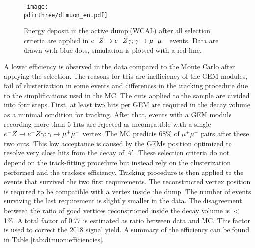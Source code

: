 \begin{figure}[tbh!]
  \centering
    \texttt{[image: \\pdirthree/dimuon\_en.pdf]}
  \caption[$\emu$ MC-DATA comparison in visible mode]{Energy deposit in the active dump (WCAL) after all selection criteria are applied in $\emu$ events. Data are drawn with blue dots, simulation is plotted with a red line.}
  \label{fig:dimuon_en}
\end{figure}

A lower efficiency is observed in the data compared to the Monte Carlo after applying the selection. The reasons for this are inefficiency of the GEM modules, fail of clusterization in some events and differences in the tracking procedure due to the simplifications used in the MC. The cuts applied to the sample are divided into four steps. First, at least two hits per GEM are required in the decay volume as a minimal condition for tracking. After that, events with a GEM module recording more than 5 hits are rejected as incompatible with a single $\emu$ vertex. The MC predicts 68\% of $\mu^+ \mu^-$ pairs after these two cuts. This low acceptance is caused by the GEMs position optimized to resolve very close hits from the decay of $A'$. These selection criteria do not depend on the track-fitting procedure but instead rely on the clusterization performed and the trackers efficiency. Tracking procedure is then applied to the events that survived the two first requirements. The reconstructed vertex position is required to be compatible with a vertex inside the dump. The number of events surviving the last requirement is slightly smaller in the data. 
The disagreement between the ratio of good vertices reconstructed inside the decay volume is $<$1\%. A total factor of 0.77 is estimated as ratio between data and MC. This factor is used to correct the 2018 signal yield. A summary of the efficiency can be found in Table \ref{tab:dimuon:efficiencies}.

